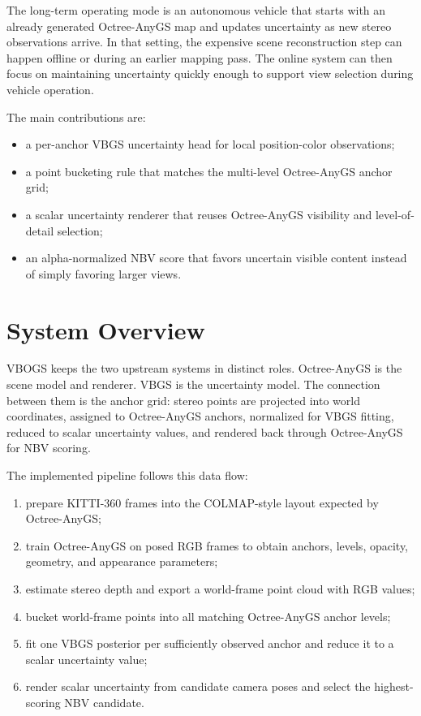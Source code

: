 \documentclass{article}
\begin{document}
The long-term operating mode is an autonomous vehicle that starts with an already generated Octree-AnyGS map and updates uncertainty as new stereo observations arrive. In that setting, the expensive scene reconstruction step can happen offline or during an earlier mapping pass. The online system can then focus on maintaining uncertainty quickly enough to support view selection during vehicle operation.

The main contributions are:

\begin{itemize}
  \item a per-anchor VBGS uncertainty head for local position-color observations;
  \item a point bucketing rule that matches the multi-level Octree-AnyGS anchor grid;
  \item a scalar uncertainty renderer that reuses Octree-AnyGS visibility and level-of-detail selection;
  \item an alpha-normalized NBV score that favors uncertain visible content instead of simply favoring larger views.
\end{itemize}

\section{System Overview}
VBOGS keeps the two upstream systems in distinct roles. Octree-AnyGS is the scene model and renderer. VBGS is the uncertainty model. The connection between them is the anchor grid: stereo points are projected into world coordinates, assigned to Octree-AnyGS anchors, normalized for VBGS fitting, reduced to scalar uncertainty values, and rendered back through Octree-AnyGS for NBV scoring.

The implemented pipeline follows this data flow:

\begin{enumerate}
  \item prepare KITTI-360 frames into the COLMAP-style layout expected by Octree-AnyGS;
  \item train Octree-AnyGS on posed RGB frames to obtain anchors, levels, opacity, geometry, and appearance parameters;
  \item estimate stereo depth and export a world-frame point cloud with RGB values;
  \item bucket world-frame points into all matching Octree-AnyGS anchor levels;
  \item fit one VBGS posterior per sufficiently observed anchor and reduce it to a scalar uncertainty value;
  \item render scalar uncertainty from candidate camera poses and select the highest-scoring NBV candidate.
\end{enumerate}
\end{document}
